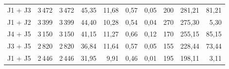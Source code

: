 \begin{tabular}{lrrrrrrrrr}
J1 + J3 & 3\,472 & 3\,472 & 45{,}35 & 11{,}68 & 0{,}57 & 0{,}05 & 200 & 281{,}21 & 81{,}21 \\
J1 + J2 & 3\,399 & 3\,399 & 44{,}40 & 10{,}28 & 0{,}54 & 0{,}04 & 270 & 275{,}30 & 5{,}30 \\
J4 + J5 & 3\,150 & 3\,150 & 41{,}15 & 11{,}27 & 0{,}66 & 0{,}12 & 170 & 255{,}15 & 85{,}15 \\
J3 + J5 & 2\,820 & 2\,820 & 36{,}84 & 11{,}64 & 0{,}57 & 0{,}05 & 155 & 228{,}44 & 73{,}44 \\
J1 + J5 & 2\,446 & 2\,446 & 31{,}95 & 9{,}91 & 0{,}46 & 0{,}01 & 195 & 198{,}11 & 3{,}11 \\
\bottomrule
\end{tabular}

